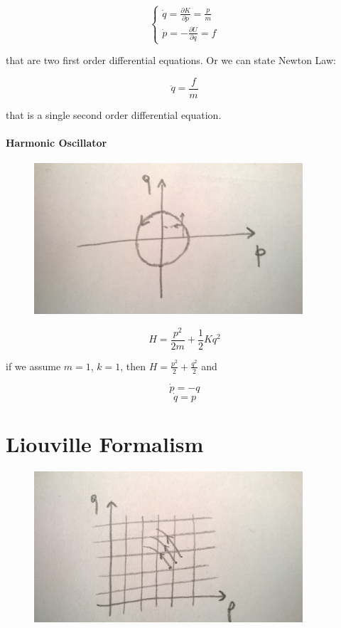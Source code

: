 \documentclass[a4paper, italian, openany]{book}
\begin{document}
$$\begin{cases}
\dot{q} = \frac{\partial K }{\partial p} = \frac{p}{m}\\
\dot{p} = - \frac{\partial U}{\partial q} = f
\end{cases}$$

that are two first order differential equations. Or we can state Newton Law:

$$\ddot{q} = \frac{f}{m}$$

that is a single second order differential equation.

\paragraph{Harmonic Oscillator}

\begin{figure}[H]
\centering
\includegraphics[width=100mm]{img/pic1.jpg}
\end{figure}

$$H = \frac{p^2}{2m} + \frac{1}{2} K q^2$$

if we assume $m=1$, $k=1$, then $H=\frac{p^2}{2} + \frac{q^2}{2}$ and

$$\dot{p} = -q$$
$$\dot{q} = p$$

\section{Liouville Formalism}

\begin{figure}[H]
\centering
\includegraphics[width=100mm]{img/pic2.jpg}
\end{figure}
\end{document}
